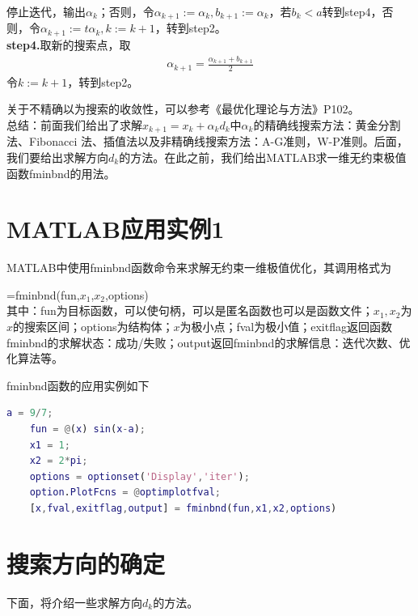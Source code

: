                 停止迭代，输出${\alpha}_k$；否则，令${\alpha}_{k+1}:={\alpha}_k,b_{k+1}:={\alpha}_k$，若$b_k < a$转到step4，否则，令${\alpha}_{k+1}:=t{\alpha}_k,k:=k+1$，转到step2。\\
        \textbf{step4.}取新的搜索点，取
                \begin{align*}
                {\alpha}_{k+1} = \frac {{\alpha}_{k+1}+ b_{k+1}}{2}
                \end{align*}
                令$k:=k+1$，转到step2。
        \par
        关于不精确以为搜索的收敛性，可以参考《最优化理论与方法》P102。\\
        总结：前面我们给出了求解$x_{k+1}=x_k+{\alpha}_k d_k$中${\alpha}_k$的精确线搜索方法：黄金分割法、Fibonacci 法、插值法以及非精确线搜索方法：A-G准则，W-P准则。后面，我们要给出求解方向$d_k$的方法。在此之前，我们给出MATLAB求一维无约束极值函数fminbnd的用法。
\section{MATLAB应用实例1}
    \par
    MATLAB中使用fminbnd函数命令来求解无约束一维极值优化，其调用格式为
    \par
    [x,fval,exitflag,output]=fminbnd(fun,$x_1$,$x_2$,options) \\
    其中：fun为目标函数，可以使句柄，可以是匿名函数也可以是函数文件；$x_1,x_2$为$x$的搜索区间；options为结构体；$x$为极小点；fval为极小值；exitflag返回函数fminbnd的求解状态：成功/失败；output返回fminbnd的求解信息：迭代次数、优化算法等。
    \par
    fminbnd函数的应用实例如下
    \begin{lstlisting}[language = Matlab]
    a = 9/7;
    fun = @(x) sin(x-a);
    x1 = 1;
    x2 = 2*pi;
    options = optionset('Display','iter');
    option.PlotFcns = @optimplotfval;
    [x,fval,exitflag,output] = fminbnd(fun,x1,x2,options)
    \end{lstlisting}
\section{搜索方向的确定}
    下面，将介绍一些求解方向$d_k$的方法。
